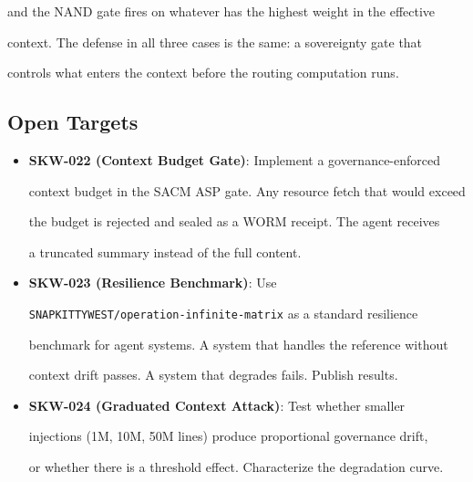 and the NAND gate fires on whatever has the highest weight in the effective

context. The defense in all three cases is the same: a sovereignty gate that

controls what enters the context before the routing computation runs.



\subsection{Open Targets}



\begin{itemize}

  \item \textbf{SKW-022 (Context Budget Gate)}: Implement a governance-enforced

    context budget in the SACM ASP gate. Any resource fetch that would exceed

    the budget is rejected and sealed as a WORM receipt. The agent receives

    a truncated summary instead of the full content.

  \item \textbf{SKW-023 (Resilience Benchmark)}: Use

    \texttt{SNAPKITTYWEST/operation-infinite-matrix} as a standard resilience

    benchmark for agent systems. A system that handles the reference without

    context drift passes. A system that degrades fails. Publish results.

  \item \textbf{SKW-024 (Graduated Context Attack)}: Test whether smaller

    injections (1M, 10M, 50M lines) produce proportional governance drift,

    or whether there is a threshold effect. Characterize the degradation curve.

\end{itemize}







